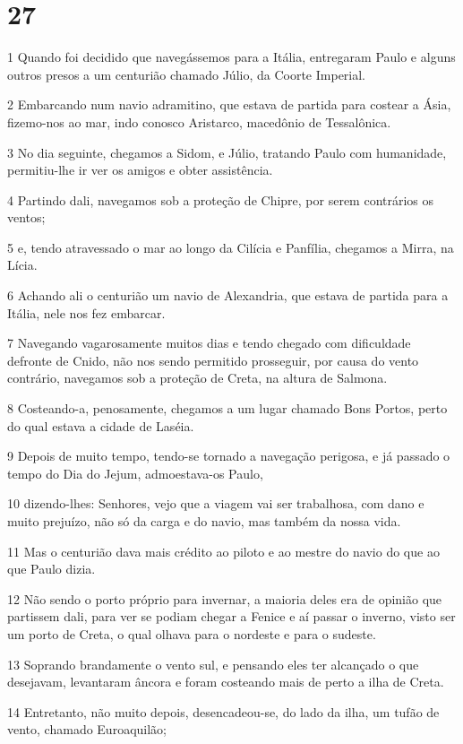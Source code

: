 \chapter{27}

\par 1 Quando foi decidido que navegássemos para a Itália, entregaram Paulo e alguns outros presos a um centurião chamado Júlio, da Coorte Imperial.
\par 2 Embarcando num navio adramitino, que estava de partida para costear a Ásia, fizemo-nos ao mar, indo conosco Aristarco, macedônio de Tessalônica.
\par 3 No dia seguinte, chegamos a Sidom, e Júlio, tratando Paulo com humanidade, permitiu-lhe ir ver os amigos e obter assistência.
\par 4 Partindo dali, navegamos sob a proteção de Chipre, por serem contrários os ventos;
\par 5 e, tendo atravessado o mar ao longo da Cilícia e Panfília, chegamos a Mirra, na Lícia.
\par 6 Achando ali o centurião um navio de Alexandria, que estava de partida para a Itália, nele nos fez embarcar.
\par 7 Navegando vagarosamente muitos dias e tendo chegado com dificuldade defronte de Cnido, não nos sendo permitido prosseguir, por causa do vento contrário, navegamos sob a proteção de Creta, na altura de Salmona.
\par 8 Costeando-a, penosamente, chegamos a um lugar chamado Bons Portos, perto do qual estava a cidade de Laséia.
\par 9 Depois de muito tempo, tendo-se tornado a navegação perigosa, e já passado o tempo do Dia do Jejum, admoestava-os Paulo,
\par 10 dizendo-lhes: Senhores, vejo que a viagem vai ser trabalhosa, com dano e muito prejuízo, não só da carga e do navio, mas também da nossa vida.
\par 11 Mas o centurião dava mais crédito ao piloto e ao mestre do navio do que ao que Paulo dizia.
\par 12 Não sendo o porto próprio para invernar, a maioria deles era de opinião que partissem dali, para ver se podiam chegar a Fenice e aí passar o inverno, visto ser um porto de Creta, o qual olhava para o nordeste e para o sudeste.
\par 13 Soprando brandamente o vento sul, e pensando eles ter alcançado o que desejavam, levantaram âncora e foram costeando mais de perto a ilha de Creta.
\par 14 Entretanto, não muito depois, desencadeou-se, do lado da ilha, um tufão de vento, chamado Euroaquilão;

